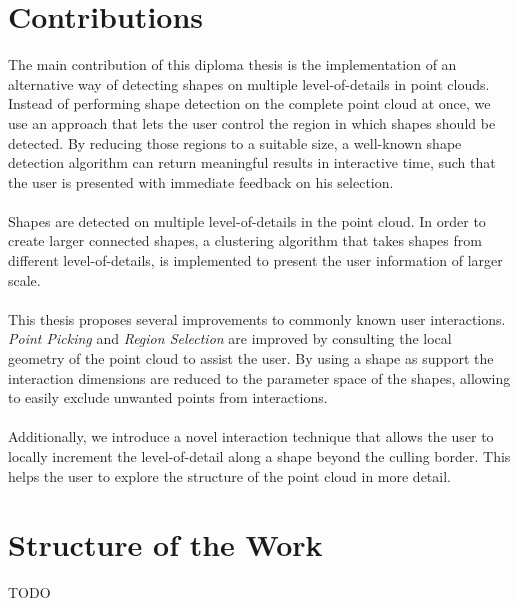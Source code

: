 

\section{Contributions}
The main contribution of this diploma thesis is the implementation of an alternative way of detecting shapes on multiple level-of-details in point clouds. Instead of performing shape detection on the complete point cloud at once, we use an approach that lets the user control the region in which shapes should be detected. By reducing those regions to a suitable size, a well-known shape detection algorithm can return meaningful results in interactive time, such that the user is presented with immediate feedback on his selection. 
\\
\\
Shapes are detected on multiple level-of-details in the point cloud. In order to create larger connected shapes, a clustering algorithm that takes shapes from different level-of-details, is implemented to present the user information of larger scale. 
\\
\\ 
This thesis proposes several improvements to commonly known user interactions. \textit{Point Picking} and \textit{Region Selection} are improved by consulting the local geometry of the point cloud to assist the user. By using a shape as support the interaction dimensions are reduced to the parameter space of the shapes, allowing to easily exclude unwanted points from interactions. 
\\
\\
Additionally, we introduce a novel interaction technique that allows the user to locally increment the level-of-detail along a shape beyond the culling border. This helps the user to explore the structure of the point cloud in more detail. 


\section{Structure of the Work}

TODO



